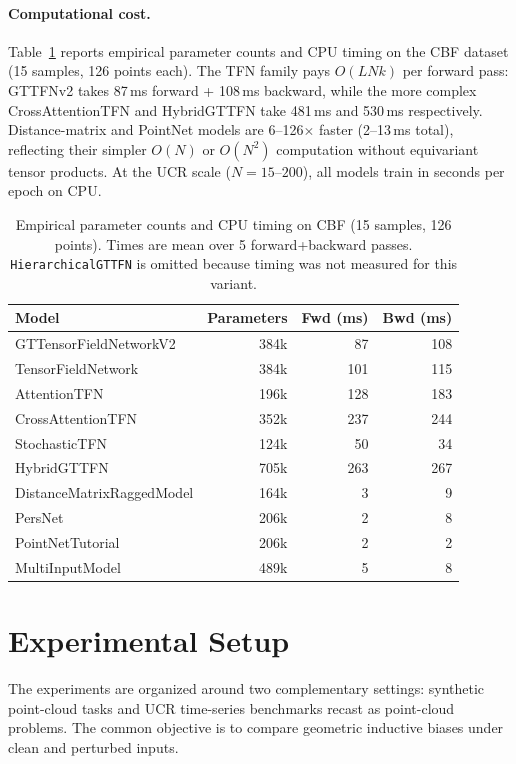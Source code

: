 \documentclass[a4paper,11pt]{article}
\begin{document}
\paragraph{Computational cost.}
Table~\ref{tab:model_cost} reports empirical parameter counts and CPU timing on the CBF dataset (15 samples, 126 points each).
The TFN family pays $O(LNk)$ per forward pass: GTTFNv2 takes 87\,ms forward + 108\,ms backward, while the more complex CrossAttentionTFN and HybridGTTFN take 481\,ms and 530\,ms respectively.
Distance-matrix and PointNet models are 6--126$\times$ faster (2--13\,ms total), reflecting their simpler $O(N)$ or $O(N^2)$ computation without equivariant tensor products.
At the UCR scale ($N=15$--$200$), all models train in seconds per epoch on CPU.

\begin{table}[ht]
\centering
\caption{Empirical parameter counts and CPU timing on CBF (15 samples, 126 points). Times are mean over 5 forward+backward passes. \texttt{HierarchicalGTTFN} is omitted because timing was not measured for this variant.}
\label{tab:model_cost}
\small
\begin{tabular}{lrrr}
\toprule
Model & Parameters & Fwd (ms) & Bwd (ms) \\
\midrule
GTTensorFieldNetworkV2 & 384k & 87 & 108 \\
TensorFieldNetwork & 384k & 101 & 115 \\
AttentionTFN & 196k & 128 & 183 \\
CrossAttentionTFN & 352k & 237 & 244 \\
StochasticTFN & 124k & 50 & 34 \\
HybridGTTFN & 705k & 263 & 267 \\
DistanceMatrixRaggedModel & 164k & 3 & 9 \\
PersNet & 206k & 2 & 8 \\
PointNetTutorial & 206k & 2 & 2 \\
MultiInputModel & 489k & 5 & 8 \\
\bottomrule
\end{tabular}
\end{table}

\section{Experimental Setup} \label{sec:experiments}

The experiments are organized around two complementary settings: synthetic point-cloud tasks and UCR time-series benchmarks recast as point-cloud problems.
The common objective is to compare geometric inductive biases under clean and perturbed inputs.
\end{document}
